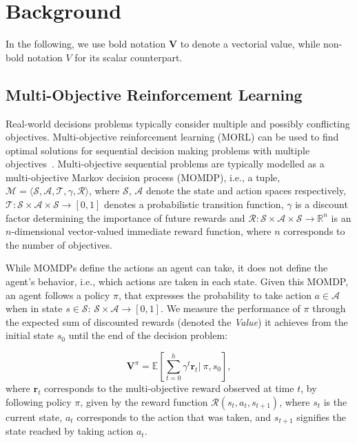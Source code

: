 \documentclass{article}
\renewcommand{\cite}[1]{\citep{#1}}
\newcommand{\mdpstatespace}{\mathcal{S}}
\newcommand{\mdpactionspace}{\mathcal{A}}
\newcommand{\mdpdiscount}{\gamma}
\newcommand{\mdppolicy}{\pi}
\newcommand{\mdpvaluefunction}{V}
\newcommand{\momdpvaluefunction}{\mathbf{V}}
\newcommand{\mdptransition}{\mathcal{T}}
\newcommand{\mdprewardfn}{\mathcal{R}}
\newcommand{\momdprewardfn}{\bm{\mathcal{R}}}
\newcommand{\state}{s}
\newcommand{\momdpreward}{\mathbf{r}}
\newcommand{\action}{a}
\newcommand{\ltuple}{\langle}
\newcommand{\rtuple}{\rangle}
\begin{document}
\section{Background}
In the following, we use bold notation $\momdpvaluefunction$ to denote a vectorial value, while non-bold notation $\mdpvaluefunction$ for its scalar counterpart.

\subsection{Multi-Objective Reinforcement Learning}
Real-world decisions problems typically consider multiple and possibly conflicting objectives. Multi-objective reinforcement learning (MORL) can be used to find optimal solutions for sequential decision making problems with multiple objectives~\cite{hayes2021practical}. Multi-objective sequential problems are typically modelled as a multi-objective Markov decision process (MOMDP), i.e., a tuple, $\mathcal{M} = \ltuple\mdpstatespace, \mdpactionspace, \mdptransition, \mdpdiscount, \momdprewardfn\rtuple$, where $\mdpstatespace$, $\mdpactionspace$ denote the state and action spaces respectively, $\mdptransition \colon \mdpstatespace \times \mdpactionspace \times \mdpstatespace  \to \left[ 0, 1 \right]$ denotes a probabilistic transition function, $\mdpdiscount$ is a discount factor determining the importance of future rewards and $\momdprewardfn \colon \mdpstatespace \times \mdpactionspace \times \mdpstatespace \to \mathbb{R}^n$ is an $n$-dimensional vector-valued immediate reward function, where $n$ corresponds to the number of objectives. 

While MOMDPs define the actions an agent can take, it does not define the agent's behavior, i.e., which actions are taken in each state. Given this MOMDP, an agent follows a policy $\mdppolicy$, that expresses the probability to take action $\action \in \mdpactionspace$ when in state $\state \in \mdpstatespace$: $\mdpstatespace \times \mdpactionspace \to \left[ 0, 1 \right]$. We measure the performance of $\mdppolicy$ through the expected sum of discounted rewards (denoted the \emph{Value}) it achieves from the initial state $\state_0$ until the end of the decision problem:

\begin{equation}
    \momdpvaluefunction^\mdppolicy = \mathbb{E} \left [ \sum_{t=0}^h \mdpdiscount^t \momdpreward_t |\ \mdppolicy, \state_0 \right ],
\end{equation}
%
where $\momdpreward_t$ corresponds to the multi-objective reward observed at time $t$, by following policy $\mdppolicy$, given by the reward function $\mdprewardfn(\state_t, \action_t, \state_{t+1})$, where $\state_t$ is the current state, $\action_t$ corresponds to the action that was taken, and $\state_{t+1}$ signifies the state reached by taking action $\action_t$.
\end{document}
